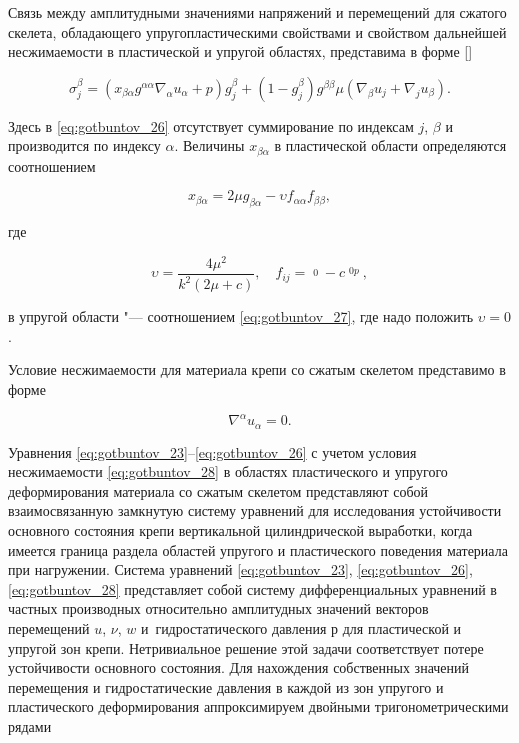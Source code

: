 Связь между амплитудными значениями напряжений и перемещений для сжатого скелета, обладающего упругопластическими свойствами и свойством дальнейшей несжимаемости в пластической и упругой областях, представима в форме []

\begin{equation} 

\label{eq:gotbuntov_26} 

\sigma_j^{\beta}=(x_{\beta\alpha}g^{\alpha\alpha}\nabla_{\alpha}u_{\alpha}+p)g_j^{\beta}+(1-g_j^{\beta})g^{\beta\beta}\mu(\nabla_{\beta}u_j+\nabla_ju_{\beta}).

\end{equation}      

Здесь в \eqref{eq:gotbuntov_26} отсутствует суммирование по индексам $j$, $\beta $ и производится по индексу $\alpha$. Величины $x_{\beta\alpha}$ в пластической области определяются соотношением 

\begin{equation} 

\label{eq:gotbuntov_27} 

x_{\beta\alpha}=2\mu g_{\beta\alpha}-\upsilon f_{\alpha\alpha}f_{\beta\beta},    

\end{equation}  

где 

$$\upsilon=\frac{4\mu^2}{k^2(2\mu+c)},\quad  f_{ij}=\mathop{s_{ij}}\limits^{0}-c\mathop{\varepsilon_{ij}}\limits^{0p},$$ 

в упругой области "--- соотношением \eqref{eq:gotbuntov_27}, где надо положить $\upsilon=0$. 



Условие несжимаемости для материала крепи со сжатым скелетом представимо в форме

\begin{equation} 

\label{eq:gotbuntov_28} 

\nabla^{\alpha}u_{\alpha}=0.  

\end{equation} 



Уравнения \eqref{eq:gotbuntov_23}--\eqref{eq:gotbuntov_26} с учетом условия несжимаемости \eqref{eq:gotbuntov_28} в областях пластического и упругого деформирования материала со сжатым скелетом представляют собой взаимосвязанную замкнутую систему уравнений для исследования устойчивости основного состояния крепи вертикальной цилиндрической выработки, когда имеется граница раздела областей упругого и пластического поведения материала при нагружении. Система уравнений \eqref{eq:gotbuntov_23}, \eqref{eq:gotbuntov_26}, \eqref{eq:gotbuntov_28} представляет собой систему дифференциальных уравнений в частных производных относительно амплитудных значений векторов перемещений $u$, $\nu$, $w$ и~гидростатического давления $р$ для пластической и упругой зон крепи. Нетривиальное решение этой задачи  соответствует потере устойчивости основного состояния. Для нахождения собственных значений  перемещения и гидростатические давления в каждой из зон упругого и пластического деформирования аппроксимируем двойными тригонометрическими рядами

